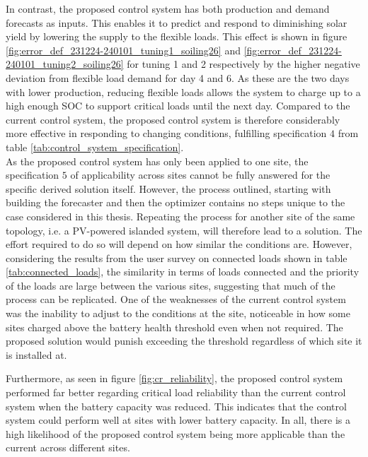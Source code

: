 In contrast, the proposed control system has both production and demand forecasts as inputs. This enables it to predict and respond to diminishing solar yield by lowering the supply to the flexible loads. This effect is shown in figure \ref{fig:error_def_231224-240101_tuning1_soiling26} and \ref{fig:error_def_231224-240101_tuning2_soiling26} for tuning 1 and 2 respectively by the higher negative deviation from flexible load demand for day 4 and 6. As these are the two days with lower production, reducing flexible loads allows the system to charge up to a high enough SOC to support critical loads until the next day. Compared to the current control system, the proposed control system is therefore considerably more effective in responding to changing conditions, fulfilling specification $4$ from table \ref{tab:control_system_specification}.\\

As the proposed control system has only been applied to one site, the specification $5$ of applicability across sites cannot be fully answered for the specific derived solution itself. However, the process outlined, starting with building the forecaster and then the optimizer contains no steps unique to the case considered in this thesis. Repeating the process for another site of the same topology, i.e. a PV-powered islanded system, will therefore lead to a solution. The effort required to do so will depend on how similar the conditions are. However, considering the results from the user survey on connected loads shown in table \ref{tab:connected_loads}, the similarity in terms of loads connected and the priority of the loads are large between the various sites, suggesting that much of the process can be replicated. One of the weaknesses of the current control system was the inability to adjust to the conditions at the site, noticeable in how some sites charged above the battery health threshold even when not required. The proposed solution would punish exceeding the threshold regardless of which site it is installed at.

Furthermore, as seen in figure \ref{fig:cr_reliability}, the proposed control system performed far better regarding critical load reliability than the current control system when the battery capacity was reduced. This indicates that the control system could perform well at sites with lower battery capacity. In all, there is a high likelihood of the proposed control system being more applicable than the current across different sites.\\  

